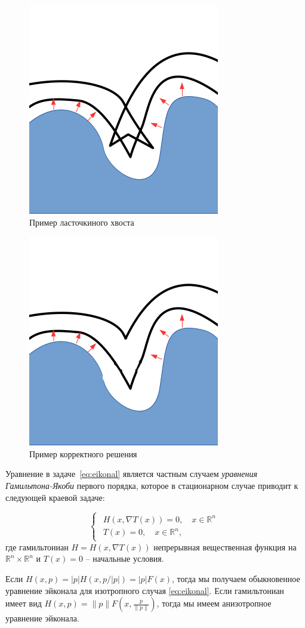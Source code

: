 \documentclass[a4paper,12pt]{article}
\begin{document}
\begin{figure}[h]
  \centering
  \includegraphics[width=0.3\linewidth]{img/swallow-tail-example.png}
  \hfil \caption{Пример ласточкиного хвоста}
  \label{fig:swallow-ex}

\end{figure}

\begin{figure}[h]
  \centering
  \includegraphics[width=0.3\linewidth]{img/corrct-example.png}
  \hfil \caption{Пример корректного решения}
  \label{fig:correct-exmp}

\end{figure}

Уравнение в задаче~\eqref{eq:eikonal} является частным случаем
\textit{уравнения Гамильтона-Якоби} первого порядка, которое в
стационарном случае приводит к следующей краевой задаче:

\begin{equation}
  \label{eq:hje}
  \begin{cases}
    \begin{array}{ll}
      H(x, \nabla T(x)) = 0,\quad x \in \mathbb{R}^n  \\
      T(x) = 0, \quad  x \in \mathbb{R}^n,
    \end{array}
  \end{cases}
\end{equation}
где гамильтониан $H = H(x,\nabla T(x))$ непрерывная вещественная функция на
$\mathbb{R}^n \times \mathbb{R}^n$ и $T(x) = 0$ -- начальные условия.

Если $H(x,p) = |p| H(x,p/|p|) = |p| F(x)$, тогда мы получаем
обыкновенное уравнение эйконала для изотропного случая
\eqref{eq:eikonal}. Если гамильтониан имеет вид
$H(x,p) = \|p\| F(x, \frac{p}{\|p\|})$, тогда мы имеем анизотропное
уравнение эйконала.
\end{document}
